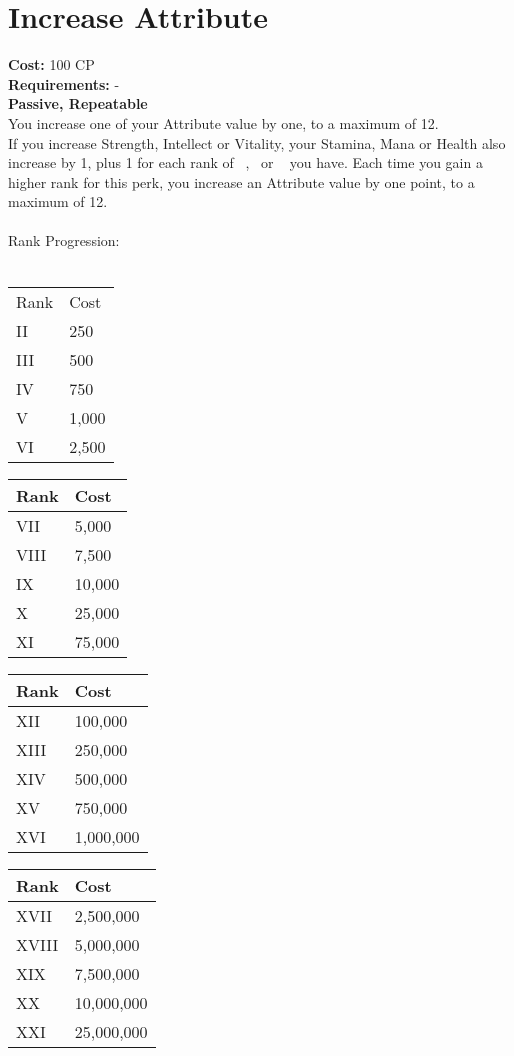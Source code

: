 \section{Increase Attribute}\label{sec:increaseattribute}
\textbf{Cost:} 100 CP\\
\textbf{Requirements:} -\\
\textbf{Passive, Repeatable}\\
You increase one of your Attribute value by one, to a maximum of 12.\\
If you increase Strength, Intellect or Vitality, your Stamina, Mana or Health also increase by 1, plus 1 for each rank of ~,~ or ~ you have.
Each time you gain a higher rank for this perk, you increase an Attribute value by one point, to a maximum of 12.\\
\\
Rank Progression:\\
\\
\begin{minipage}{0.22\textwidth}
	\begin{tabular}{l | l}
		Rank & Cost\\
		II & 250\\
		III & 500\\
		IV & 750\\
		V & 1,000\\
		VI & 2,500\\
	\end{tabular}
\end{minipage}
\begin{minipage}{0.22\textwidth}
	\begin{tabular}{l | l}
		Rank & Cost\\ \hline
		VII & 5,000\\
		VIII & 7,500\\
		IX & 10,000\\
		X & 25,000\\
		XI & 75,000\\
	\end{tabular}
\end{minipage}
\begin{minipage}{0.22\textwidth}
	\begin{tabular}{l | l}
		Rank & Cost\\ \hline
		XII & 100,000\\
		XIII & 250,000\\
		XIV & 500,000\\
		XV & 750,000\\
		XVI & 1,000,000\\
	\end{tabular}
\end{minipage}
\begin{minipage}{0.22\textwidth}
	\begin{tabular}{l | l}
		Rank & Cost\\ \hline
		XVII & 2,500,000\\
		XVIII & 5,000,000\\
		XIX & 7,500,000\\
		XX & 10,000,000\\
		XXI & 25,000,000\\
	\end{tabular}
\end{minipage}